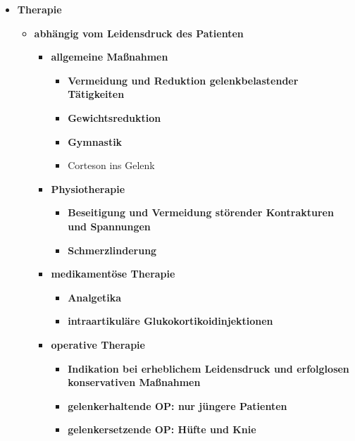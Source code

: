 \begin{itemize}
\begin{itemize}
				\end{itemize}
		\pagebreak
			\item \textbf{Therapie}
				\begin{itemize}
					\item \textbf{abhängig vom Leidensdruck des Patienten}
						\begin{itemize}
							\item \textbf{allgemeine Maßnahmen}
								\begin{itemize}
									\item \textbf{Vermeidung und Reduktion gelenkbelastender Tätigkeiten}
									\item \textbf{Gewichtsreduktion}
									\item \textbf{Gymnastik}
									\item Corteson ins Gelenk
								\end{itemize}
							\item \textbf{Physiotherapie}
								\begin{itemize}
									\item \textbf{Beseitigung und Vermeidung störender Kontrakturen und Spannungen}
									\item \textbf{Schmerzlinderung}
								\end{itemize}
							\item \textbf{medikamentöse Therapie}
								\begin{itemize}
									\item \textbf{Analgetika}
									\item \textbf{intraartikuläre Glukokortikoidinjektionen}
								\end{itemize}
							\item \textbf{operative Therapie}
								\begin{itemize}
									\item \textbf{Indikation bei erheblichem Leidensdruck und erfolglosen konservativen Maßnahmen}
									\item \textbf{gelenkerhaltende OP: nur jüngere Patienten}
									\item \textbf{gelenkersetzende OP: Hüfte und Knie}
					  			\end{itemize}
						\end{itemize}
	  			\end{itemize}
	  	\end{itemize}
